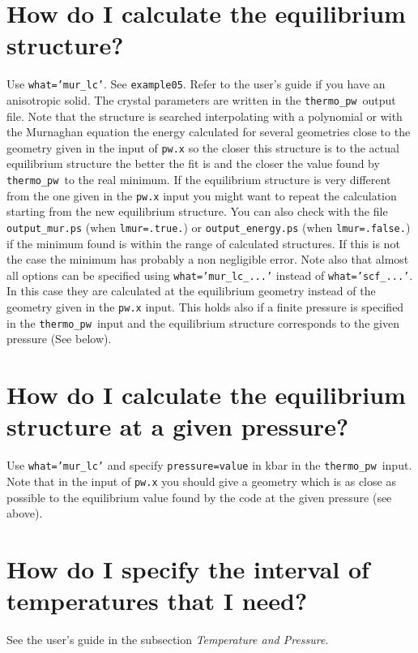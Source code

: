 \documentclass[12pt,a4paper]{article}
\def\thermo{\texttt{thermo\_pw}}
\begin{document}
\section{\color{coral}How do I calculate the equilibrium structure?}
Use \texttt{what='mur\_lc'}. See \texttt{example05}. Refer to the user's
guide if you have an anisotropic solid. The crystal
parameters are written in the \thermo\ output file. Note that the structure is
searched interpolating with a polynomial or with the Murnaghan
equation the energy calculated for several geometries close to the geometry 
given in the input of \texttt{pw.x} so the closer this structure is to the 
actual equilibrium structure the better the fit is and the
closer the value found by \thermo\ to the real minimum. If the 
equilibrium structure is very different from the one given in the 
\texttt{pw.x} input you might want to repeat the calculation starting 
from the new equilibrium structure. You can also check with the file
\texttt{output\_mur.ps} (when \texttt{lmur=.true.}) or 
\texttt{output\_energy.ps} (when \texttt{lmur=.false.}) if the minimum
found is within the range of calculated structures. If this is not 
the case the minimum has probably a non negligible error.
Note also that almost all options can be specified using
\texttt{what='mur\_lc\_...'} instead of \texttt{what='scf\_...'}.
In this case they are calculated at the equilibrium geometry instead of
the geometry given in the \texttt{pw.x} input. 
This holds also if a finite pressure is specified in the \thermo\ input 
and the equilibrium structure corresponds to the given pressure (See below).

\section{\color{coral}How do I calculate the equilibrium structure 
at a given pressure?}
Use \texttt{what='mur\_lc'} and specify \texttt{pressure=value} in kbar in the
\thermo\ input. Note that in the input of \texttt{pw.x} you should 
give a geometry which is as close as possible to the equilibrium value
found by the code at the given pressure (see above).

\section{\color{coral} How do I specify the interval of temperatures that 
I need?}
See the user's guide in the subsection {\it Temperature and Pressure}.
\end{document}
